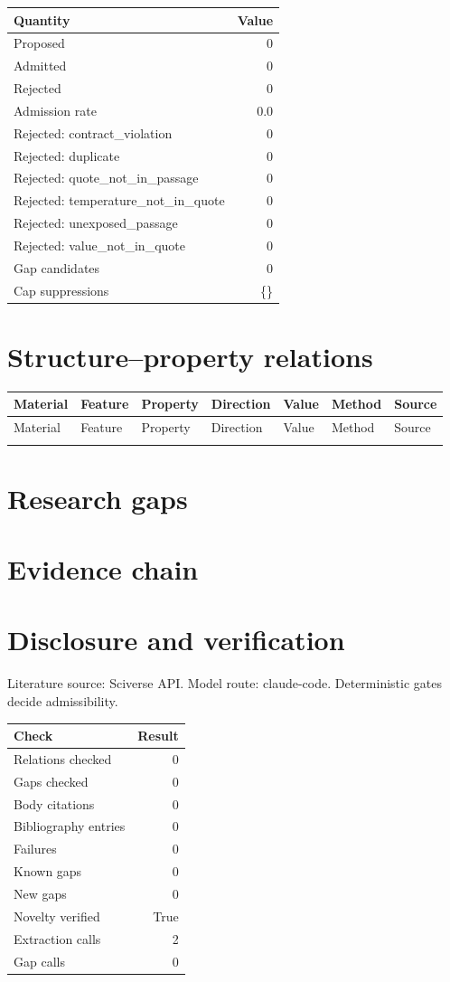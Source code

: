\documentclass[11pt,a4paper]{article}
\begin{document}
\begin{tabular}{lr}
\toprule
Quantity & Value \\
\midrule
Proposed & 0 \\
Admitted & 0 \\
Rejected & 0 \\
Admission rate & 0.0 \\
Rejected: contract\_violation & 0 \\
Rejected: duplicate & 0 \\
Rejected: quote\_not\_in\_passage & 0 \\
Rejected: temperature\_not\_in\_quote & 0 \\
Rejected: unexposed\_passage & 0 \\
Rejected: value\_not\_in\_quote & 0 \\
Gap candidates & 0 \\
Cap suppressions & \{\} \\
\bottomrule
\end{tabular}

\section{Structure--property relations}
\begin{longtable}{p{22mm}p{26mm}p{24mm}p{16mm}p{20mm}p{14mm}l}
\toprule
Material & Feature & Property & Direction & Value & Method & Source \\
\midrule
\endfirsthead\toprule
Material & Feature & Property & Direction & Value & Method & Source \\
\midrule\endhead\bottomrule\endfoot
\end{longtable}

\section{Research gaps}
\section{Evidence chain}
\label{sec:chain}
\section{Disclosure and verification}
Literature source: Sciverse API. Model route: claude-code. Deterministic gates decide admissibility.

\begin{tabular}{lr}
\toprule
Check & Result \\
\midrule
Relations checked & 0 \\
Gaps checked & 0 \\
Body citations & 0 \\
Bibliography entries & 0 \\
Failures & 0 \\
Known gaps & 0 \\
New gaps & 0 \\
Novelty verified & True \\
Extraction calls & 2 \\
Gap calls & 0 \\
\bottomrule
\end{tabular}



\end{document}
